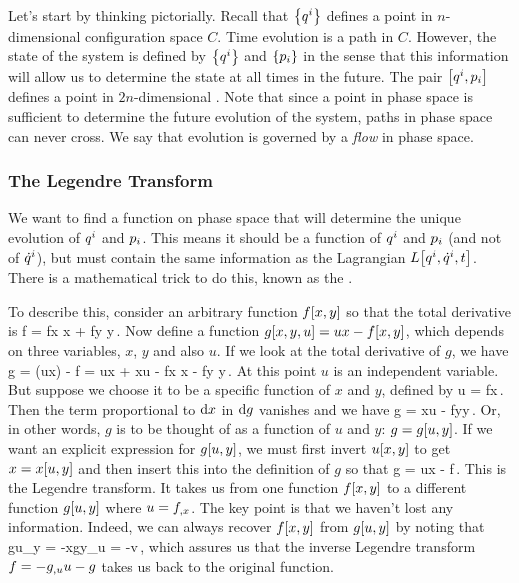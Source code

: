 Let's start by thinking pictorially. Recall that $\left\lbrace{{q}^{i}}\right\rbrace$ defines a point in $n$-dimensional configuration space $C$. Time evolution is a path in $C$. However, the state of the system is defined by $\left\lbrace{{q}^{i}}\right\rbrace$ and $\left\lbrace{{p}_{i}}\right\rbrace$ in the sense that this information will allow us to determine the state at all times in the future. The pair $\left[{{q}^{i}, {p}_{i}}\right]$ defines a point in $2n$-dimensional . Note that since a point in phase space is sufficient to determine the future evolution of the system, paths in phase space can never cross. We say that evolution is governed by a \emph{flow} in phase space.


\subsubsection{The Legendre Transform}
We want to find a function on phase space that will determine the unique evolution of ${q}^{i}$ and ${p}_{i}$. This means it should be a function of ${q}^{i}$ and ${p}_{i}$ (and not of ${\dot{q}}^{i}$), but must contain the same information as the Lagrangian $L\!\left[{{q}^{i},{\dot{q}}^{i}, t}\right]$. There is a mathematical trick to do this, known as the .

To describe this, consider an arbitrary function $f\!\left[{x,y}\right]$ so that the total derivative is 
\beq
\dx f = \xpd fx \dx x + \xpd fy \dx y\,.
\eeq
Now define a function $g\!\left[{x,y,u}\right] = ux - f\!\left[{x,y}\right]$, which depends on three variables, $x$, $y$ and also $u$. If we look at the total derivative of $g$, we have
\beq
\dx g = \dx(ux) - \dx f = u\dx x + x\dx u - \xpd fx \dx x - \xpd fy \dx y\,.
\eeq
At this point $u$ is an independent variable. But suppose we choose it to be a specific function of $x$ and $y$, defined by
\beq
u = \xpd fx\,.
\eeq
Then the term proportional to $\text{d} x$ in $\text{d} g$ vanishes and we have 
\beq
\dx g = x\dx u - \xpd fy\dx y\,.
\eeq
Or, in other words, $g$ is to be thought of as a function of $u$ and $y$: $g = g\!\left[{u,y}\right]$. If we want an explicit expression for $g\!\left[{u,y}\right]$, we must first invert $u\!\left[{x,y}\right]$ to get $x = x\!\left[{u,y}\right]$ and then insert this into the definition of $g$ so that
\beq
g = ux - f\,.
\eeq
This is the Legendre transform. It takes us from one function $f\!\left[{x,y}\right]$ to a different function $g\!\left[{u,y}\right]$ where $u = {f}_{,{x}}$. The key point is that we haven't lost any information. Indeed, we can always recover $f\!\left[{x,y}\right]$ from $g\!\left[{u,y}\right]$ by noting that
\beq
\xpd gu\vert_y = -x\qquad{}\qquad \xpd gy\vert_u = -v\,,
\eeq
which assures us that the inverse Legendre transform $f = -{g}_{,{u}} u - g$ takes us back to the original function.

